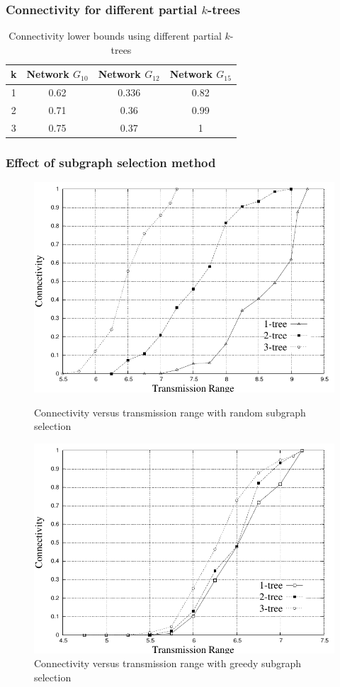 \documentclass{beamer}
\begin{document}
\begin{frame}
\frametitle{Connectivity for different partial $k$-trees}
\begin{table}[!htb] 
      \centering
     \begin{tabular}{|c|c|c|c|}
     \hline
      k& Network $G_{10}$ & Network $G_{12}$ & Network $G_{15}$ \\
     \hline
      1 & 0.62&0.336& 0.82 \\\hline
2 &0.71 & 0.36& 0.99\\\hline
3 &0.75& 0.37& 1\\\hline
\end{tabular}
 \caption{Connectivity lower bounds using different partial $k$-trees}
 \label{Tab:acc}
\end{table}
\end{frame}
\begin{frame}
\frametitle{Effect of subgraph selection method}

\begin{figure}[!htb]
\begin{minipage}[]{.45\linewidth}
\includegraphics[width=2.2 in, height=2.2 in]{Random-eps-converted-to.pdf}
 \caption{ Connectivity versus transmission range with random subgraph selection
}
\label{fig:res}
\end{minipage}
\begin{minipage}{.45\linewidth}
\includegraphics[width=2.2 in, height=2.2 in]{Selective-eps-converted-to.pdf}
 \caption{ Connectivity versus transmission range with greedy subgraph selection
}
\label{fig:ges}
 \end{minipage}
\end{figure}

\end{frame}
\end{document}
